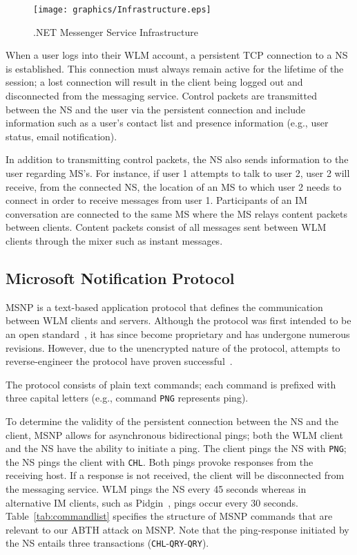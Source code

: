 \documentclass{sig-alternate}
\begin{document}
\begin{figure}[h]
	\centering
	\caption{.NET Messenger Service Infrastructure}
	\label{fig:wlminfrastructure}
	\texttt{[image: graphics/Infrastructure.eps]}
\end{figure}

When a user logs into their WLM account, a persistent TCP connection to a NS is established.
This connection must always remain active for the lifetime of the session; a lost connection will result in the client being logged out and disconnected from the messaging service.
Control packets are transmitted between the NS and the user via the persistent connection and include information such as a user's contact list and presence information (e.g., user status, email notification).

In addition to transmitting control packets, the NS also sends information to the user regarding MS's.
For instance, if user 1 attempts to talk to user 2, user 2 will receive, from the connected NS, the location of an MS to which user 2 needs to connect in order to receive messages from user 1.
Participants of an IM conversation are connected to the same MS where the MS relays content packets between clients.
Content packets consist of all messages sent between WLM clients through the mixer such as instant messages.

\subsection{Microsoft Notification Protocol}

MSNP is a text-based application protocol that defines the communication between WLM clients and servers.
Although the protocol was first intended to be an open standard~\cite{fout:insidewlm}, it has since become proprietary and has undergone numerous revisions.
However, due to the unencrypted nature of the protocol, attempts to reverse-engineer the protocol have proven successful~\cite{hypothetic:msnp, msnfanatic:msnp}.

The protocol consists of plain text commands; each command is prefixed with three capital letters (e.g., command \texttt{PNG} represents ping).

To determine the validity of the persistent connection between the NS and the client, MSNP allows for asynchronous bidirectional pings; both the WLM client and the NS have the ability to initiate a ping.
The client pings the NS with \texttt{PNG}; the NS pings the client with \texttt{CHL}.
Both pings provoke responses from the receiving host. 
If a response is not received, the client will be disconnected from the messaging service.
WLM pings the NS every 45 seconds whereas in alternative IM clients, such as Pidgin~\cite{pidgin:url}, pings occur every 30 seconds.
Table~\ref{tab:commandlist} specifies the structure of MSNP commands that are relevant to our ABTH attack on MSNP.
Note that the ping-response initiated by the NS entails three transactions (\texttt{CHL}-\texttt{QRY}-\texttt{QRY}).
\end{document}
